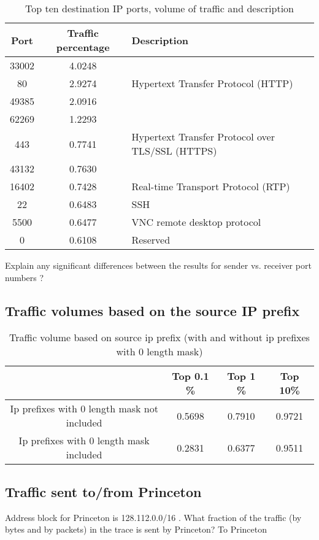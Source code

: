 \documentclass[11pt,a4paper,titlepage]{article}
\begin{document}
\begin{table}[H]
	\centering
	\begin{tabular}{ |c|c|l| } 
		 \hline
		\textbf{Port} & \textbf{Traffic percentage} & \textbf{Description} \\ \hline
		33002   & 4.0248    & \\ \hline
		80      & 2.9274    & Hypertext Transfer Protocol (HTTP) \\ \hline
		49385   & 2.0916    & \\ \hline
		62269   & 1.2293    & \\ \hline
		443     & 0.7741    & Hypertext Transfer Protocol over TLS/SSL (HTTPS)\\ \hline
		43132   & 0.7630    & \\ \hline
		16402   & 0.7428    & Real-time Transport Protocol (RTP)\\ \hline
		22      & 0.6483    & SSH \\ \hline
		5500    & 0.6477    & VNC remote desktop protocol \\ \hline
		0       & 0.6108    & Reserved \\ \hline
	\end{tabular}
	\caption{Top ten destination IP ports, volume of traffic and description}	
\end{table}

Explain any significant differences between the results for sender vs. receiver port numbers ? 

\subsection{Traffic volumes based on the source IP prefix}


\begin{table}[H]
	\centering
	\begin{tabular}{ |c|c|c|c| } 
		\hline
& Top 0.1 \%& Top 1 \%& Top 10\% \\ \hline
Ip prefixes with 0 length mask not included & 0.5698 & 0.7910 & 0.9721 \\ \hline
Ip prefixes with 0 length mask included & 0.2831 & 0.6377 & 0.9511 \\ \hline 
	\end{tabular}
	\caption{ Traffic volume based on source ip prefix (with and without ip prefixes with 0 length mask) }	
\end{table}


\subsection{Traffic sent to/from Princeton}
Address block for Princeton is 128.112.0.0/16 . What fraction of the traffic (by bytes and by packets) in the trace is sent by Princeton? To Princeton
\end{document}
